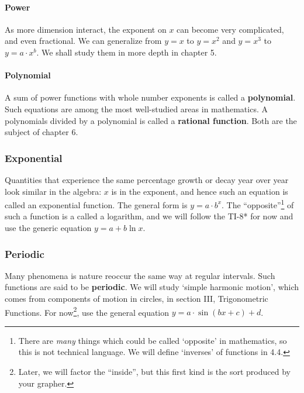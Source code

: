 \paragraph{Power}
As more dimension interact, the exponent on $x$ can become very 
complicated, and even fractional.  We can generalize
from $y=x$ to $y=x^2$ and $y=x^3$ to $y=a\cdot x^b$.  We shall study them in more depth
in chapter 5.

\paragraph{Polynomial}
A sum of power functions with whole number exponents is called a
\textbf{polynomial}.  Such equations are among the most well-studied
areas in mathematics.  A polynomials divided by a polynomial is called
a \textbf{rational function}.  Both are the subject of chapter 6.

\subsubsection{Exponential}
Quantities that experience the same percentage growth or decay 
year over year look similar in the algebra: $x$ is in
the exponent, and hence such an equation is called an \gls{exponential} function.  The general form
is $y=a\cdot b^x$.  
The ``opposite''\footnote{There are \emph{many} things 
which could be called `opposite'
in mathematics, so this is not technical language.  We will define `inverses' of functions in 4.4.} of such a 
function is a called a \gls{logarithm}, and we will follow the TI-8* for now and use the generic equation
$y=a+b\ln{x}$.  

\subsubsection{Periodic}
Many phenomena is nature reoccur the same way at regular intervals.  Such functions are said to be 
\textbf{periodic}.
We will  study `simple harmonic motion', which comes from components of motion in circles, in section III,
Trigonometric Functions.  For now\footnote{Later, we
will factor the ``inside'', but this first kind is the sort produced by your grapher.}, use the general equation $y=a\cdot\sin(bx+c)+d$.

